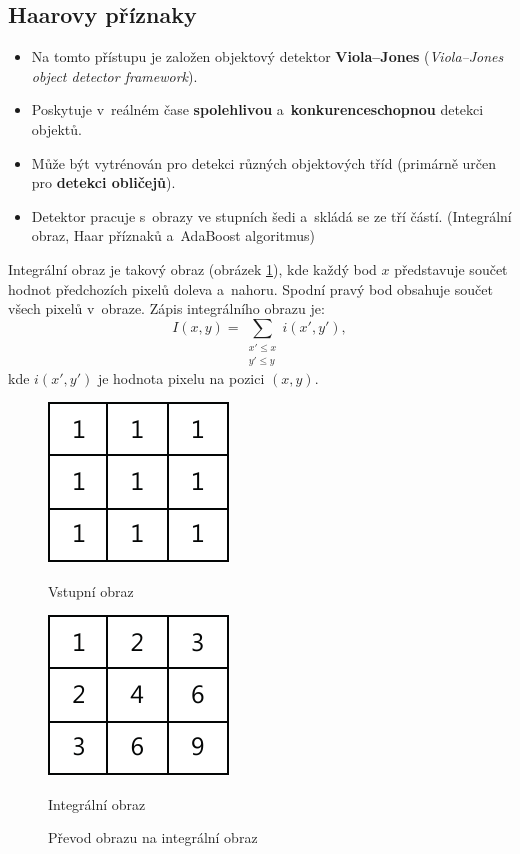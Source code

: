 \subsection{Haarovy příznaky}
\begin{itemize}
  \item Na tomto přístupu je založen objektový detektor \textbf{Viola--Jones} (\textit{Viola--Jones object detector framework}).
  \item Poskytuje v~reálném čase \textbf{spolehlivou} a~\textbf{konkurenceschopnou} detekci objektů.
  \item Může být vytrénován pro detekci různých objektových tříd (primárně určen pro \textbf{detekci obličejů}).
  \item Detektor pracuje s~obrazy ve stupních šedi a~skládá se ze tří částí. (Integrální obraz, Haar příznaků a~AdaBoost algoritmus)
\end{itemize} 
Integrální obraz je takový obraz (obrázek \ref{fig:integralimage}), kde každý bod $x$ představuje součet hodnot předchozích pixelů doleva a~nahoru. Spodní pravý bod obsahuje součet všech pixelů v~obraze.
Zápis integrálního obrazu je:
\begin{equation*}
\label{integralimage}
 I(x, y) = \sum_{\substack{x' \leq x \\ y' \leq y}}{} i(x', y'),
\end{equation*}
kde $i(x', y')$ je hodnota pixelu na pozici $(x, y)$.
\begin{figure}[H]
\centering
\begin{minipage}{.4\textwidth}
  \centering
  \includegraphics[width=.5\linewidth]{assets/9_ii_input}
  \caption{Vstupní obraz}
  \label{fig:ii_input}
\end{minipage}%
\begin{minipage}{.4\textwidth}
  \centering
  \includegraphics[width=.5\linewidth]{assets/9_ii_output}
  \caption{Integrální obraz}
  \label{fig:ii_output}
\end{minipage}
\caption{Převod obrazu na integrální obraz}
\label{fig:integralimage}
\end{figure}

